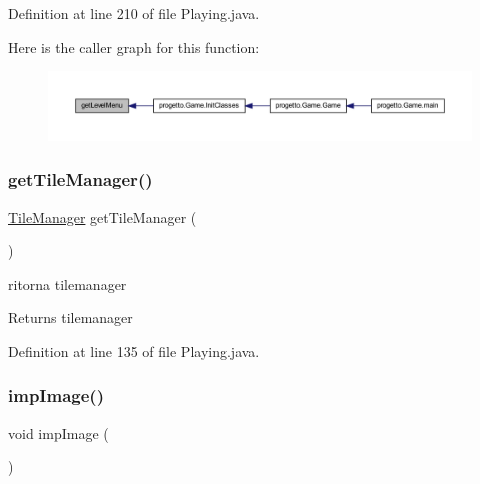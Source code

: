Definition at line 210 of file Playing.\+java.

Here is the caller graph for this function\+:\nopagebreak
\begin{figure}[H]
\begin{center}
\leavevmode
\includegraphics[width=350pt]{classscenes_1_1_playing_a0ce048e98f125d557d6b5f68d8993bb5_icgraph}
\end{center}
\end{figure}
\mbox{\label{classscenes_1_1_playing_ad519f2a339c804d206a38ecd2c33f667}} 
\subsubsection{\texorpdfstring{get\+Tile\+Manager()}{getTileManager()}}
{\footnotesize\ttfamily \hyperlink{classmanagers_1_1_tile_manager}{Tile\+Manager} get\+Tile\+Manager (\begin{DoxyParamCaption}{ }\end{DoxyParamCaption})}



ritorna tilemanager 

\begin{DoxyReturn}{Returns}
tilemanager 
\end{DoxyReturn}


Definition at line 135 of file Playing.\+java.

\mbox{\label{classscenes_1_1_playing_aded9c531b53772fd90d09a8b6bf0132e}} 
\subsubsection{\texorpdfstring{imp\+Image()}{impImage()}}
{\footnotesize\ttfamily void imp\+Image (\begin{DoxyParamCaption}{ }\end{DoxyParamCaption})\hspace{0.3cm}{\ttfamily [private]}}




